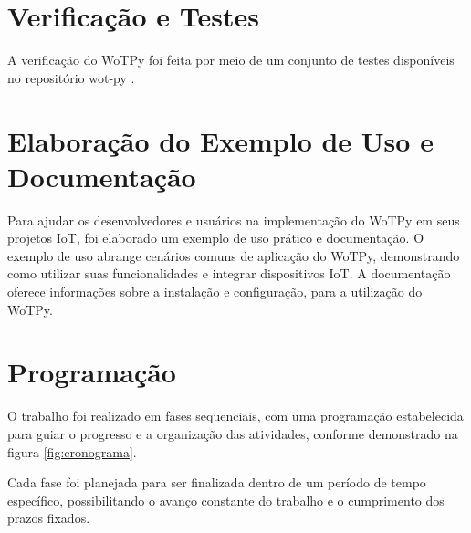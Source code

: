 \section{Verificação e Testes}

A verificação do WoTPy foi feita por meio de um conjunto de testes disponíveis no repositório wot-py .

\section{Elaboração do Exemplo de Uso e Documentação}

Para ajudar os desenvolvedores e usuários na implementação do WoTPy em seus projetos IoT, foi elaborado um exemplo de uso prático e documentação. O exemplo de uso abrange cenários comuns de aplicação do WoTPy, demonstrando como utilizar suas funcionalidades e integrar dispositivos IoT. A documentação oferece informações sobre a instalação e configuração, para a utilização do WoTPy.

\section{Programação}

O trabalho foi realizado em fases sequenciais, com uma programação estabelecida para guiar o progresso e a organização das atividades, conforme demonstrado na figura \ref{fig:cronograma}.

Cada fase foi planejada para ser finalizada dentro de um período de tempo específico, possibilitando o avanço constante do trabalho e o cumprimento dos prazos fixados.

%
%

